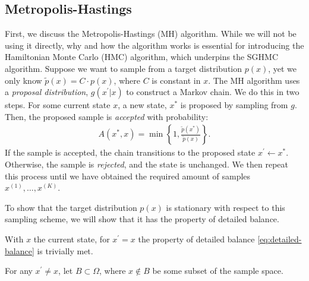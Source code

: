 \subsection{Metropolis-Hastings}
First, we discuss the Metropolis-Hastings (MH) algorithm.
While we will not be using it directly, why and how the algorithm works is essential for introducing the Hamiltonian Monte Carlo (HMC) algorithm, which underpins the SGHMC algorithm.
Suppose we want to sample from a target distribution $p(x)$, yet we only know $\tilde{p}(x) = C \cdot p(x)$, where $C$ is constant in $x$.
The MH algorithm uses a \emph{proposal distribution}, $g(x^\prime|x)$ to construct a Markov chain.
We do this in two steps.
For some current state $x$, a new state, $x^\ast$ is proposed by sampling from $g$.
Then, the proposed sample is \emph{accepted} with probability:
\begin{align}
    A(x^{\ast}, x) = \min\left\{1, \frac{\tilde{p}(x^\ast)}{\tilde{p}(x)}\right\}.
\end{align}
If the sample is accepted, the chain transitions to the proposed state $x^\prime \gets x^\ast$.
Otherwise, the sample is \emph{rejected}, and the state is unchanged.
We then repeat this process until we have obtained the required amount of samples $x^{(1)},\dots,x^{(K)}$. 

To show that the target distribution $p(x)$ is stationary with respect to this sampling scheme, we will show that it has the property of detailed balance.

With $x$ the current state, for $x^\prime=x$ the property of detailed balance \cref{eq:detailed-balance} is trivially met.

For any $x^\prime \neq x$, let $B\subset \Omega$, where $x\not\in B$ be some subset of the sample space. 

